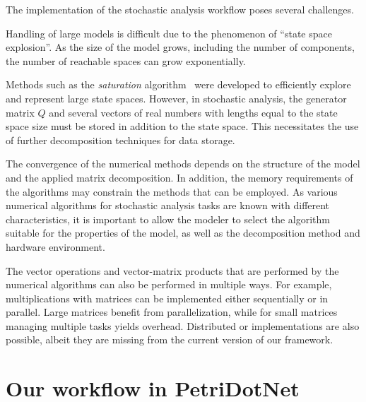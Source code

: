 The implementation of the stochastic analysis workflow poses several
challenges.

Handling of large models is difficult due to the phenomenon of
\enquote{state space explosion}. As the size of the model grows,
including the number of components, the number of reachable spaces can
grow exponentially.

Methods such as the \emph{saturation} algorithm~\citep{Ciardo:2006}
were developed to efficiently explore and represent large state
spaces. However, in stochastic analysis, the generator matrix $Q$ and
several vectors of real numbers with lengths equal to the state space
size must be stored in addition to the state space. This necessitates
the use of further decomposition techniques for data storage.

The convergence of the numerical methods depends on the structure of
the model and the applied matrix decomposition. In addition, the memory
requirements of the algorithms may constrain the methods that can be
employed. As various numerical algorithms for stochastic analysis
tasks are known with different characteristics, it is important to
allow the modeler to select the algorithm suitable for the properties
of the model, as well as the decomposition method and hardware environment.

The vector operations and vector-matrix products that are performed by
the numerical algorithms can also be performed in multiple ways. For
example, multiplications with matrices can be implemented either
sequentially or in parallel. Large matrices benefit from
parallelization, while for small matrices managing
multiple tasks yields overhead. Distributed or 
implementations are also possible, albeit they are missing from the
current version of our framework.

\section{Our workflow in PetriDotNet}
\label{chap:overview:sec:our-workflow}

